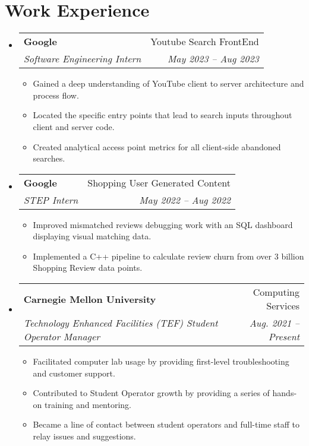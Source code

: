 \documentclass[letterpaper,11pt]{article}
\makeatletter
\newcommand{\resumeItem}[1]{
  \item\small{
    {#1 \vspace{-2pt}}
  }
}
\newcommand{\resumeSubheading}[4]{
  \vspace{-2pt}\item
    \begin{tabular*}{0.97\textwidth}[t]{l@{\extracolsep{\fill}}r}
      \textbf{#1} & #2 \\
      \textit{\small#3} & \textit{\small #4} \\
    \end{tabular*}\vspace{-7pt}
}
\newcommand{\resumeSubHeadingListStart}{\begin{itemize}[leftmargin=0.15in, label={}]}
\newcommand{\resumeSubHeadingListEnd}{\end{itemize}}
\newcommand{\resumeItemListStart}{\begin{itemize}}
\newcommand{\resumeItemListEnd}{\end{itemize}\vspace{-5pt}}
\makeatother
\begin{document}
\section{Work Experience}
    \resumeSubHeadingListStart
        \resumeSubheading
        {Google}{Youtube Search FrontEnd}
        {Software Engineering Intern}{May 2023 -- Aug 2023}
            \resumeItemListStart
                \resumeItem{Gained a deep understanding of YouTube client to server architecture and process flow.}
                \resumeItem{Located the specific entry points that lead to search inputs throughout client and server code.}
                \resumeItem{Created analytical access point metrics for all client-side abandoned searches.}
            \resumeItemListEnd
        \resumeSubheading
        {Google}{Shopping User Generated Content}
        {STEP Intern}{May 2022 -- Aug 2022}
            \resumeItemListStart
                \resumeItem{Improved mismatched reviews debugging work with an SQL dashboard displaying visual matching data.}
                \resumeItem{Implemented a C++ pipeline to calculate review churn from over 3 billion Shopping Review data points.}
            \resumeItemListEnd
        \resumeSubheading
        {Carnegie Mellon University}{Computing Services}
        {Technology Enhanced Facilities (TEF) Student Operator Manager}{Aug. 2021 -- Present}
            \resumeItemListStart
                \resumeItem{Facilitated computer lab usage by providing first-level troubleshooting and customer support.}
                \resumeItem{Contributed to Student Operator growth by providing a series of hands-on training and mentoring.}
                \resumeItem{Became a line of contact between student operators and full-time staff to relay issues and suggestions.}
            \resumeItemListEnd
    \resumeSubHeadingListEnd

\end{document}
